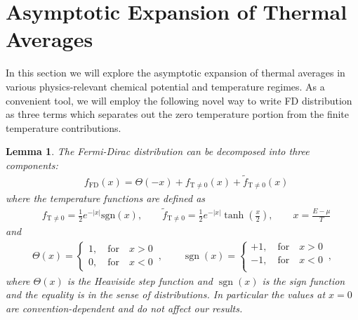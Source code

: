 \documentclass[sn-mathphys,Numbered]{sn-jnl}
\DeclareMathOperator{\sgn}{sgn}
\newtheorem{lemma}[theorem]{Lemma}
\begin{document}
\section{Asymptotic Expansion of Thermal Averages }\label{sec:Sommerfeld}
In this section we will explore the asymptotic expansion of thermal averages in various  physics-relevant  chemical potential and temperature regimes.   As a convenient tool, we will employ the following novel way to write FD distribution as three terms which separates out the zero temperature portion from the finite temperature contributions. 
\begin{lemma}
    The Fermi-Dirac distribution can be decomposed into three components:
\begin{align}\label{Eq_form}
&f_\mathrm{FD}(x)=\Theta(-x)+f_\mathrm{T\neq0}(x)+\widetilde f_\mathrm{T\neq0}(x)
\end{align}
where the temperature functions are defined as
\begin{align}\label{eq:f_T_nonzero_def}
&f_\mathrm{T\neq0}=\frac{1}{2}e^{ -|x| }\mathrm{sgn}\left(x\right),\qquad
\widetilde f_\mathrm{T\neq0}=\frac{1}{2}e^{ - |x| }\tanh\left(\frac{x}{2}\right),\qquad x=\frac{E-\mu}{T}
\end{align}
and
\begin{align}
\label{NFF2}
\Theta(x)=\left\{
\begin{array}{r}
1,\quad\mathrm{for}\quad{x}>0\\
0,\quad\mathrm{for}\quad{x}<0
\end{array}\right.\,,\qquad
\sgn(x)=\left\{
\begin{array}{r}
+1,\quad\mathrm{for}\quad{x}>0\\
-1,\quad\mathrm{for}\quad{x}<0\\
\end{array}\right.\,,
\end{align}
where $\Theta(x)$ is the Heaviside step function and $\sgn(x)$ is the sign function and the equality is in the sense of distributions. In particular the values at $x=0$ are convention-dependent and do not affect our results. 
\end{lemma}
\end{document}
